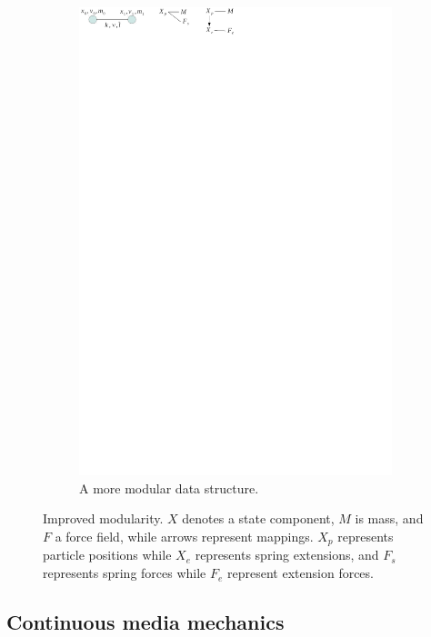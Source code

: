 \begin{figure}
\begin{subfigure}[t]{0.3\linewidth}
   \includegraphics[clip,trim=80mm 280mm 100mm 0mm]{mass-spring.pdf}
   \caption{A more modular data structure.} \label{fig mass-spring-flexible}
 \end{subfigure}
 \caption{Improved modularity. $X$ denotes a state component, $M$ is mass, and $F$ a force field, while arrows represent mappings. $X_p$ represents particle positions while $X_e$ represents spring extensions, and $F_s$ represents spring forces while $F_e$ represent extension forces.}
 \label{fig modularity mass-spring}
\end{figure}


\subsection{Continuous media mechanics}









